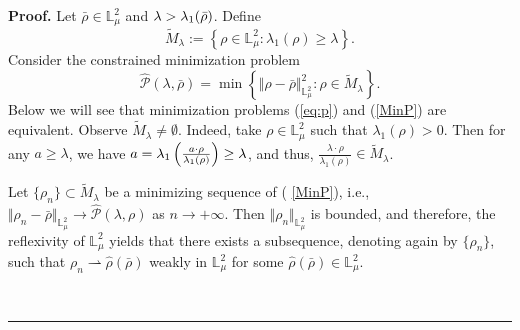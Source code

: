 \documentclass[12pt,thmsa]{article}
\newenvironment{proof}[1][Proof]{\noindent\textbf{#1.} }{\ \rule{0.5em}{0.5em}}
\begin{document}
\begin{proof}
Let $\bar{\rho}\in \mathbb{L}_{\mu }^{2}$ and $\lambda >\lambda _{1}(\bar{%
\rho})$. Define
\begin{equation*}
\tilde{M}_{\lambda }:=\left\{ \rho \in \mathbb{L}_{\mu }^{2}:\lambda
_{1}(\rho )\geq \lambda \right\} .
\end{equation*}%
Consider the constrained minimization problem
\begin{equation}
\hat{\mathcal{P}}(\lambda ,\bar{\rho})=\min \left\{ \Vert \rho -\bar{\rho}%
\Vert _{\mathbb{L}_{\mu }^{2}}^{2}:\rho \in \tilde{M}_{\lambda }\right\} .
\label{MinP}
\end{equation}%
Below we will see that minimization problems (\ref{eq:p}) and (\ref{MinP})
are equivalent. Observe $\tilde{M}_{\lambda }\neq \emptyset $. Indeed, take $%
\rho \in \mathbb{L}_{\mu }^{2}$ such that $\lambda _{1}(\rho )>0$. Then for
any $a\geq \lambda $, we have $a=\lambda _{1}\left( \frac{a\cdot \rho }{%
\lambda _{1}(\rho )}\right) \geq \lambda $, and thus, $\frac{\lambda \cdot
\rho }{\lambda _{1}(\rho )}\in \tilde{M}_{\lambda }$.

Let $\{\rho _{n}\}\subset \tilde{M}_{\lambda}$ be a minimizing sequence of (%
\ref{MinP}), i.e., $\Vert \rho _{n}-\bar{\rho} \Vert _{\mathbb{L}_{\mu
}^{2}}\rightarrow \hat{\mathcal{P}}(\lambda ,\rho )$ as $n\rightarrow
+\infty $. Then $\Vert \rho _{n}\Vert _{\mathbb{L}_{\mu }^{2}}$ is bounded,
and therefore, the reflexivity of $\mathbb{L}_{\mu }^{2}$ yields that there
exists a subsequence, denoting again by $\{\rho _{n}\}$, such that $\rho
_{n}\rightharpoonup \hat{\rho}(\bar{\rho})$ weakly in $\mathbb{L}_{\mu }^{2}$
for some $\hat{\rho}(\bar{\rho})\in \mathbb{L}_{\mu }^{2}$.


\end{proof}
\end{document}
